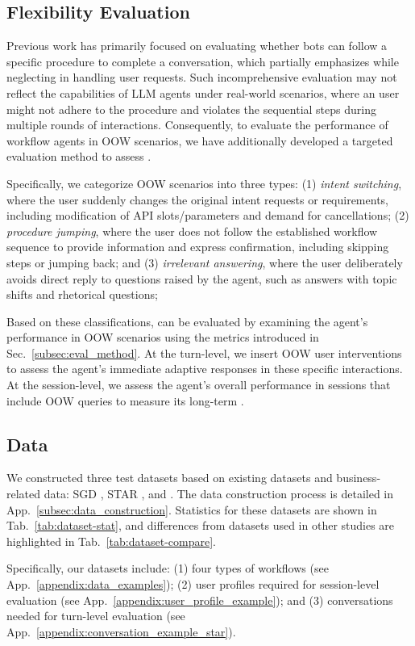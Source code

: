 \subsection{Flexibility Evaluation}
Previous work \citep{GLAD,TRADE,AutoFlow} has primarily focused on evaluating whether bots can follow a specific procedure to complete a conversation, which partially emphasizes \ofollow while neglecting \oflex in handling user requests. Such incomprehensive evaluation may not reflect the capabilities of LLM agents under real-world scenarios, where an  user might not adhere to the procedure and violates the sequential steps during multiple rounds of interactions. Consequently, to evaluate the performance of workflow agents in OOW scenarios, we have additionally developed a targeted evaluation method to assess \oflex.

Specifically, we categorize OOW scenarios into three types: 
(1) \textit{intent switching}, where the user suddenly changes the original intent requests or requirements, including modification of API slots/parameters and demand for cancellations; 
(2) \textit{procedure jumping}, where the user does not follow the established workflow sequence to provide information and express confirmation, including skipping steps or jumping back; 
and (3) \textit{irrelevant answering}, where the user deliberately avoids direct reply to questions raised by the agent, such as answers with topic shifts and rhetorical questions;

Based on these classifications, \oflex can be evaluated by examining the agent's performance in OOW scenarios using the metrics introduced in Sec.~\ref{subsec:eval_method}. At the turn-level, we insert OOW user interventions to assess the agent's immediate adaptive responses in these specific interactions.  At the session-level, we assess the agent's overall performance in sessions that include OOW queries to measure its long-term \oflex. 

\subsection{Data} \label{subsec:data}

We constructed three test datasets based on existing datasets and business-related data: SGD \citep{SGD}, STAR \citep{STAR}, and \dinhouse. The data construction process is detailed in App.~\ref{subsec:data_construction}. Statistics for these datasets are shown in Tab.~\ref{tab:dataset-stat}, and differences from datasets used in other studies are highlighted in Tab.~\ref{tab:dataset-compare}.

Specifically, our datasets include: (1) four types of workflows (see App.~\ref{appendix:data_examples}); (2) user profiles required for session-level evaluation (see App.~\ref{appendix:user_profile_example}); and (3) conversations needed for turn-level evaluation (see App.~\ref{appendix:conversation_example_star}).

